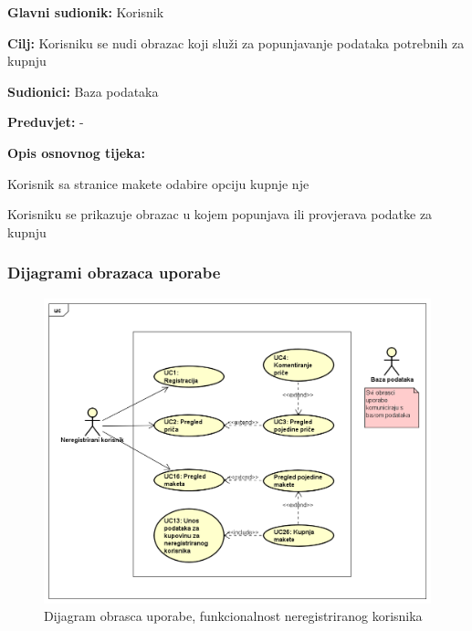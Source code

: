 			\noindent {}
			\begin{packed_item}
				
				\item \textbf{Glavni sudionik: }Korisnik
				\item  \textbf{Cilj:} Korisniku se nudi obrazac koji služi za popunjavanje podataka potrebnih za kupnju
				\item  \textbf{Sudionici:} Baza podataka
				\item  \textbf{Preduvjet:} -
				\item  \textbf{Opis osnovnog tijeka:}
				
				\item[] \begin{packed_enum}
					
					\item Korisnik sa stranice makete odabire opciju kupnje nje
					\item Korisniku se prikazuje obrazac u kojem popunjava ili provjerava podatke za kupnju
				\end{packed_enum}
			\end{packed_item}
					
				\subsubsection{Dijagrami obrazaca uporabe}
					
					\begin{figure}[H]
						\includegraphics[width=.9\linewidth]{slike/Funkcionalnost_neregistriranog_korisnika.PNG} %
						\caption{Dijagram obrasca uporabe, funkcionalnost neregistriranog korisnika}
						\label{fig:obrupo1} %
					\end{figure}					
					
